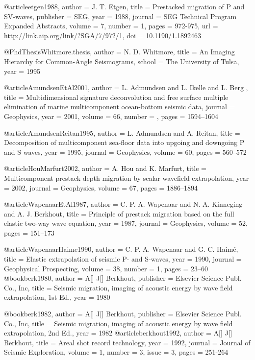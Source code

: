 @article{etgen1988,
  author =	 {J. T. Etgen},
  title =	 {Prestacked migration of {P} and {S}{V}-waves},
  publisher =	 {SEG},
  year =	 1988,
  journal =	 {SEG Technical Program Expanded Abstracts},
  volume =	 7,
  number =	 1,
  pages =	 {972-975},
  url =		 {http://link.aip.org/link/?SGA/7/972/1},
  doi =		 {10.1190/1.1892463}
}

@PhdThesis{Whitmore.thesis,
  author =	 {N. D. Whitmore},
  title =	 {An Imaging Hierarchy for Common-Angle Seismograms},
  school =	 {The University of Tulsa},
  year =	 1995
}

@article{AmundsenEtAl2001,
author = {L. Admundsen and L. Ikelle and L. Berg },
title = {Multidimensional signature deconvolution and free surface multiple elimination of marine multicomponent ocean-bottom seismic data},
journal = {Geophysics},
year = {2001},
volume = {66},
number = {},
pages = {1594--1604}
}

@article{AmundsenReitan1995,
  author =	 {L. Admundsen and A. Reitan},
  title =	 {Decomposition of multicomponent sea-floor data into
                  upgoing and downgoing {P} and {S} waves},
  year =	 1995,
  journal =	 {Geophysics},
  volume =	 60,
  pages =	 {560--572}
}

@article{HouMarfurt2002,
  author =	 {A. Hou and K. Marfurt},
  title =	 {Multicomponent prestack depth migration by scalar
                  wavefield extrapolation},
  year =	 2002,
  journal =	 {Geophysics},
  volume =	 67,
  pages =	 {1886--1894}
}

@article{WapenaarEtAl1987,
  author =	 {C. P. A. Wapenaar and N. A. Kinneging and
                  A. J. Berkhout},
  title =	 {Principle of prestack migration based on the full
                  elastic two-way wave equation},
  year =	 1987,
  journal =	 {Geophysics},
  volume =	 52,
  pages =	 {151--173}
}

@article{WapenaarHaime1990,
  author =	 {C. P. A. Wapenaar and G. C. Haim\'{e}},
  title =	 {Elastic extrapolation of seismic {P}- and {S}-waves},
  year =	 1990,
  journal =	 {Geophysical Prospecting},
  volume =	 38,
  number =	 1,
  pages =	 {23--60}
}
@book{berk1980,
   author = {A[] J[] Berkhout},
   publisher = {Elsevier Science Publ. Co., Inc},
   title = {Seismic migration, imaging of acoustic energy by wave field extrapolation, 1st Ed.},
   year = {1980}
}

@book{berk1982,
   author = {A[] J[] Berkhout},
   publisher = {Elsevier Science Publ. Co., Inc},
   title = {Seismic migration, imaging of acoustic energy by wave field extrapolation, 2nd Ed.},
   year = {1982}
}
@article{berkhout1992,
  author =	 {A[] J[] Berkhout},
  title =	 {Areal shot record technology},
  year =	 1992,
  journal =	 {Journal of Seismic Exploration},
  volume =	 1,
  number = 3,
  issue  = 3,
  pages =	 {251-264}
}


